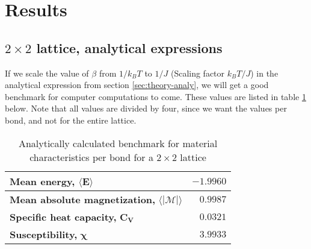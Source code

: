\documentclass[../main.tex]{subfiles}
\begin{document}
\section{Results}
\subsection{$2 \times 2$ lattice, analytical expressions}
If we scale the value of $\beta$ from $1/k_BT$ to $1/J$ (Scaling factor $k_B T/J$) in the analytical expression from section \ref{sec:theory-analy}, we will get a good benchmark for computer computations to come. These values are listed in table \ref{tab:2x2spinsEnergiesMags} below. Note that all values are divided by four, since we want the values per bond, and not for the entire lattice.
\begin{table}[!h]
\begin{center}
  \begin{tabular}{| l | r |}
    \hline
    \textbf{Mean energy,} $\mathbf{\langle E \rangle}$ & $-1.9960$  \\
    \hline
    \textbf{Mean absolute magnetization,} $\mathbf{\langle |\mathcal{M}| \rangle}$ & $0.9987$ \\
    \hline
    \textbf{Specific heat capacity,} $\mathbf{C_V}$ & $0.0321$\\
    \hline
    \textbf{Susceptibility,} $\mathbf \chi$ & $3.9933$ \\
    \hline
  \end{tabular}
  \caption{Analytically calculated benchmark for material characteristics per bond for a $2 \times 2$ lattice}
  \label{tab:2x2spinsEnergiesMags}
\end{center}
\end{table}
\FloatBarrier

\end{document}
